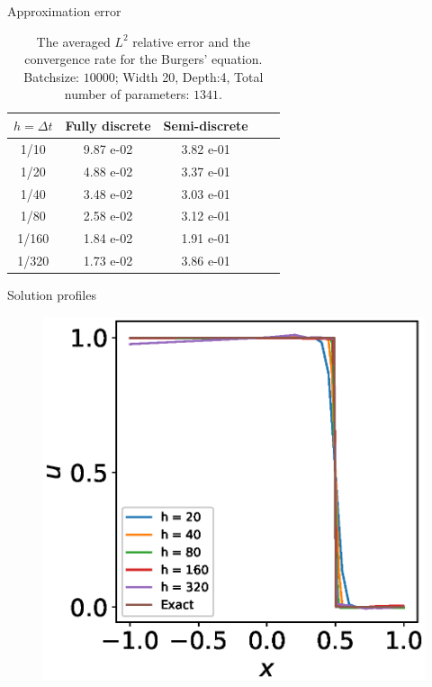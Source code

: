 \documentclass[aspectratio=169]{beamer}
\begin{document}
\begin{frame}{Approximation error}
\begin{table}[H]
 \centering
 \begin{tabular}{|c|c|c|c|c|}
 \hline
     $h=\Delta t$ & Fully discrete     & Semi-discrete \\
 	\hline
	1/10 & 9.87 e-02  &  3.82 e-01\\
    1/20 & 4.88 e-02  &  3.37 e-01\\
    1/40 & 3.48 e-02  &  3.03 e-01\\
	1/80 & 2.58 e-02  &  3.12 e-01\\
	1/160& 1.84 e-02  &  1.91 e-01\\
	1/320& 1.73 e-02  &  3.86 e-01\\
\hline
 \end{tabular}
 \caption{The averaged $L^2$ relative error and the convergence rate for the Burgers' equation. Batchsize: $10000$; Width 20, Depth:4, Total number of parameters: $1341$.}
 \end{table}

\end{frame}

\begin{frame}{Solution profiles}
 \begin{figure}[H]

	\includegraphics[width=0.4\linewidth]{Figure/Burgus_equation_numerical_100}
\end{figure}
\end{frame}
\end{document}
